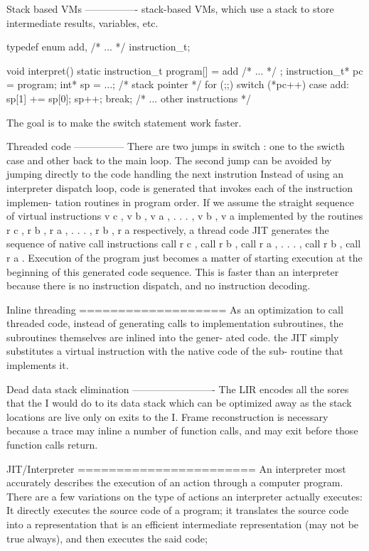 Stack based VMs
----------------
stack-based VMs, which use a stack to store
intermediate results, variables, etc.


typedef enum {
add, /* ... */
} instruction_t;

void interpret() {
  static instruction_t program[] = { add /* ... */ };
  instruction_t* pc = program;
  int* sp = ...; /* stack pointer */
  for (;;) {
  switch (*pc++) {
    case add:
      sp[1] += sp[0];
      sp++;
      break;
    /* ... other instructions */
  }
  }
}

The goal is to make the switch statement work faster.


Threaded code
---------------
There are two jumps in switch : one to the swicth case and other back to the main loop.
The second jump can be avoided by jumping directly to the code handling the 
next instrution
Instead of using an
interpreter dispatch loop, code is generated that invokes each of the instruction implemen-
tation routines in program order. 
If we assume the straight sequence of virtual instructions
v c , v b , v a , . . . , v b , v a implemented by the routines 
r c , r b , r a , . . . , r b , r a respectively, a thread
code JIT generates the sequence of native call instructions call r c , call r b , call r a , . . . ,
call r b , call r a . Execution of the program just becomes a matter of starting execution at
the beginning of this generated code sequence. This is faster than an interpreter because
there is no instruction dispatch, and no instruction decoding.

Inline threading
===================
As an optimization to call threaded code, instead of generating
calls to implementation subroutines, the subroutines themselves are inlined into the gener-
ated code. 
the JIT simply substitutes a virtual instruction with the native code of the sub-
routine that implements it. 



Dead data stack elimination
-------------------------
The LIR encodes all the sores that the I would do to its data stack
which can be optimized away as the stack locations are live only  on exits to the 
I.
Frame reconstruction is necessary because a trace may inline a number of function calls, and may exit before those function calls return. 


JIT/Interpreter
=======================
An interpreter most accurately describes the execution of an action through a
computer program. There are a few variations on the type of actions an
interpreter actually executes: It directly executes the source code of a
program; it translates the source code into a representation that is an
efficient intermediate representation (may not be true always), and then executes the said code; 

